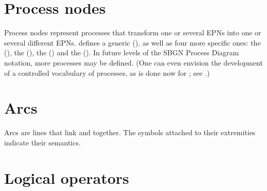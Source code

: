 \section{Process nodes}\label{sec:PNs}

Process nodes represent processes that transform one or several EPNs into one or several different EPNs.   \SBGNPDLone defines a generic  (), as well as four more specific ones: the  (), the  (), the  () and the  ().  In future levels of the SBGN Process Diagram notation, more processes may be defined.  (One can even envision the development of a controlled vocabulary of processes, as is done now for ; see .)









\section{Arcs}\label{sec:arcs}

Arcs are lines that link  and  together.  The symbols attached to their extremities indicate their semantics.













\section{Logical operators}\label{sec:logic}








